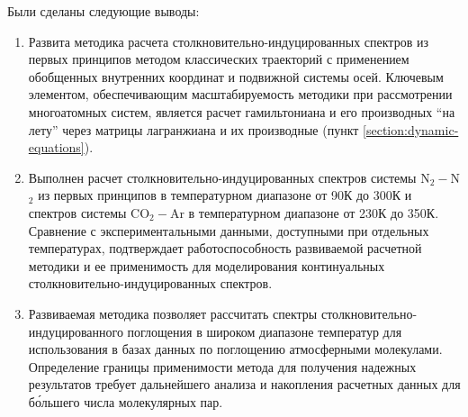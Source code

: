 Были сделаны следующие выводы:
\begin{enumerate}
    \item Развита методика расчета столкновительно-индуцированных спектров из первых принципов методом классических траекторий с применением обобщенных внутренних координат и подвижной системы осей. Ключевым элементом, обеспечивающим масштабируемость методики при рассмотрении многоатомных систем, является расчет гамильтониана и его производных \enquote{на лету} через матрицы лагранжиана и их производные (пункт \ref{section:dynamic-equations}).
    \item Выполнен расчет столкновительно-индуцированных спектров системы N$_2-$N$_2$ из первых принципов в температурном диапазоне от 90К до 300К  и спектров системы CO$_2-$Ar в температурном диапазоне от 230К до 350К. Сравнение с экспериментальными данными, доступными при отдельных температурах, подтверждает работоспособность развиваемой расчетной методики и ее применимость для моделирования континуальных столкновительно-индуцированных спектров.
    \item Развиваемая методика позволяет рассчитать спектры столкновительно-индуци\-рован\-ного поглощения в широком диапазоне температур для использования в базах данных по поглощению атмосферными молекулами. Определение границы применимости метода для получения надежных результатов требует дальнейшего анализа и накопления расчетных данных для б\'{о}льшего числа молекулярных пар.  
\end{enumerate}

\iffalse
Из проделанной работы были сделаны следующие выводы
\begin{enumerate}
    \item Построена методика расчета столкновительно-индуцированных спектров методом классических траекторий. При помощи развитой методики проведены расчеты спектров систем He$-$Ar, CO$_2-$Ar и N$_2-$N$_2$, которые находятся в хорошем согласии с экспериментальными и теоретическими данными.
\end{enumerate}
\fi
